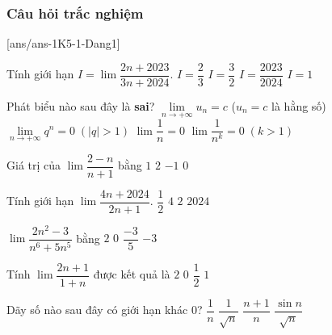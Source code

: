 \subsubsection{Câu hỏi trắc nghiệm}
[ans/ans-1K5-1-Dang1]
\begin{ex}%
	Tính giới hạn $I=\lim\dfrac{2n+2023}{3n+2024}$. 
	\choice
	{\True $I=\dfrac{2}{3}$}
	{$I=\dfrac{3}{2}$}
	{$I=\dfrac{2023}{2024}$}
	{$I=1$}
\end{ex}
\begin{ex}%
	Phát biểu nào sau đây là \textbf{sai}?
	\choice
	{$\lim \limits_{n \to +\infty}u_n=c$ ($u_n=c$ là hằng số)}
	{\True $\lim \limits_{n \to +\infty}q^n=0 \;(|q|>1)$}
	{$\lim\dfrac{1}{n}=0$}
	{$\lim\dfrac{1}{n^k}=0 \; (k>1)$}
\end{ex}
\begin{ex}%
	Giá trị của $\lim\dfrac{2-n}{n+1}$ bằng
	\choice
	{$1$}
	{$2$}
	{\True $-1$}
	{$0$}
\end{ex}
\begin{ex}%
	Tính giới hạn $\lim\dfrac{4n+2024}{2n+1}$. 
	\choice
	{$\dfrac{1}{2}$}
	{$4$}
	{\True $2$}
	{$2024$}
\end{ex}
\begin{ex}%
	$\lim\dfrac{2n^2-3}{n^6+5n^5}$ bằng 
	\choice
	{$2$}
	{\True $0$}
	{$\dfrac{-3}{5}$}
	{$-3$}
\end{ex}
\begin{ex}%
	Tính $\lim\dfrac{2n+1}{1+n}$ được kết quả là
	\choice
	{\True $2$}
	{$0$}
	{$\dfrac{1}{2}$}
	{$1$}
\end{ex}

\begin{ex}%
	Dãy số nào sau đây có giới hạn khác $0$?
	\choice
	{$\dfrac{1}{n}$}
	{$\dfrac{1}{\sqrt{n}}$}
	{\True $\dfrac{n+1}{n}$}
	{$\dfrac{\sin n}{\sqrt{n}}$}
\end{ex}

